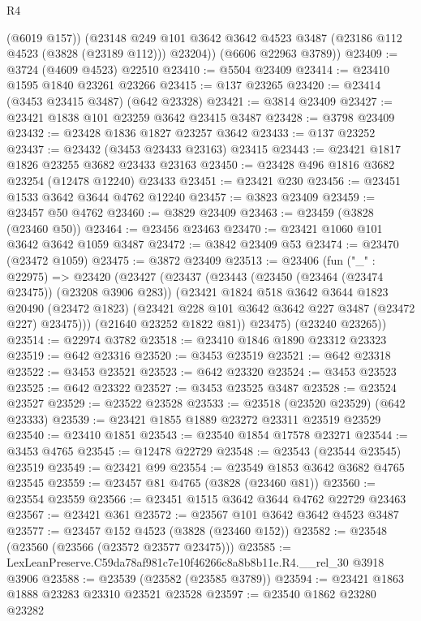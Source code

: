 \begin{lexlean}{R4}
\begin{coremodule}
          (@6019 @157))
        (@23148 @249 @101 @3642 @3642 @4523 @3487 (@23186 @112 @4523 (@3828 (@23189 @112))) @23204))
      (@6606 @22963 @3789))
@23409 := @3724 (@4609 @4523) @22510
@23410 := @5504 @23409
@23414 := @23410 @1595 @1840 @23261 @23266
@23415 := @137 @23265
@23420 := @23414 (@3453 @23415 @3487) (@642 @23328)
@23421 := @3814 @23409
@23427 := @23421 @1838 @101 @23259 @3642 @23415 @3487
@23428 := @3798 @23409
@23432 := @23428 @1836 @1827 @23257 @3642
@23433 := @137 @23252
@23437 := @23432 (@3453 @23433 @23163) @23415
@23443 := @23421 @1817 @1826 @23255 @3682 @23433 @23163
@23450 := @23428 @496 @1816 @3682 @23254 (@12478 @12240) @23433
@23451 := @23421 @230
@23456 := @23451 @1533 @3642 @3644 @4762 @12240
@23457 := @3823 @23409
@23459 := @23457 @50 @4762
@23460 := @3829 @23409
@23463 := @23459 (@3828 (@23460 @50))
@23464 := @23456 @23463
@23470 := @23421 @1060 @101 @3642 @3642 @1059 @3487
@23472 := @3842 @23409 @53
@23474 := @23470 (@23472 @1059)
@23475 := @3872 @23409
@23513 := @23406
    (fun ("_" : @22975) =>
    @23420
      (@23427
        (@23437
          (@23443
            (@23450 (@23464 (@23474 @23475)) (@23208 @3906 @283))
            (@23421
              @1824
              @518
              @3642
              @3644
              @1823
              @20490
              (@23472 @1823)
              (@23421 @228 @101 @3642 @3642 @227 @3487 (@23472 @227) @23475)))
          (@21640 @23252 @1822 @81))
        @23475)
      (@23240 @23265))
@23514 := @22974 @3782
@23518 := @23410 @1846 @1890 @23312 @23323
@23519 := @642 @23316
@23520 := @3453 @23519
@23521 := @642 @23318
@23522 := @3453 @23521
@23523 := @642 @23320
@23524 := @3453 @23523
@23525 := @642 @23322
@23527 := @3453 @23525 @3487
@23528 := @23524 @23527
@23529 := @23522 @23528
@23533 := @23518 (@23520 @23529) (@642 @23333)
@23539 := @23421 @1855 @1889 @23272 @23311 @23519 @23529
@23540 := @23410 @1851
@23543 := @23540 @1854 @17578 @23271
@23544 := @3453 @4765
@23545 := @12478 @22729
@23548 := @23543 (@23544 @23545) @23519
@23549 := @23421 @99
@23554 := @23549 @1853 @3642 @3682 @4765 @23545
@23559 := @23457 @81 @4765 (@3828 (@23460 @81))
@23560 := @23554 @23559
@23566 := @23451 @1515 @3642 @3644 @4762 @22729 @23463
@23567 := @23421 @361
@23572 := @23567 @101 @3642 @3642 @4523 @3487
@23577 := @23457 @152 @4523 (@3828 (@23460 @152))
@23582 := @23548 (@23560 (@23566 (@23572 @23577 @23475)))
@23585 := LexLeanPreserve.C59da78af981c7e10f46266c8a8b8b11e.R4.__rel_30 @3918 @3906
@23588 := @23539 (@23582 (@23585 @3789))
@23594 := @23421 @1863 @1888 @23283 @23310 @23521 @23528
@23597 := @23540 @1862 @23280 @23282

\end{coremodule}
\end{lexlean}
